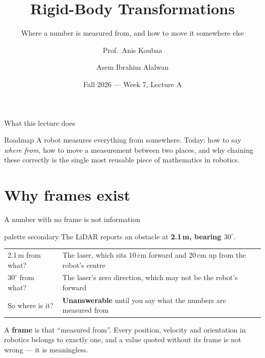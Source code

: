 \documentclass[aspectratio=169]{beamer}
\title[EE 414 --- Week 7A]{Rigid-Body Transformations}
\subtitle{Where a number is measured from, and how to move it somewhere else}
\author[Koubaa \and Alalwan]{Prof.\ Anis Koubaa \and Asem Ibrahim Alalwan}
\institute[Alfaisal University]{
    EE 414 --- Introduction to Robotics\\
    College of Engineering\\
    Alfaisal University
}
\date{Fall 2026 --- Week 7, Lecture A}
\begin{document}
\begin{frame}[plain]
  \titlepage
\end{frame}

\begin{frame}{What this lecture does}
  \begin{block}{Roadmap}
    \small A robot measures everything from somewhere. Today: how to say \emph{where from},
    how to move a measurement between two places, and why chaining these correctly is the
    single most reusable piece of mathematics in robotics.
  \end{block}
  \vspace{0.2em}
  {\scriptsize\tableofcontents[hideallsubsections]}
\end{frame}

\section{Why frames exist}

\begin{frame}{A number with no frame is not information}
  \begin{beamercolorbox}[sep=8pt,center,rounded=true]{palette secondary}
    \small The LiDAR reports an obstacle at \textbf{2.1\,m, bearing $30^\circ$}.
  \end{beamercolorbox}

  \vspace{0.9em}
  \small
  \begin{center}
  \begin{tabular}{@{}ll@{}}
    \toprule
    2.1\,m from what? & The laser, which sits 10\,cm forward and 20\,cm up from the robot's centre \\
    $30^\circ$ from what? & The laser's zero direction, which may not be the robot's forward \\
    So where is it? & \textbf{Unanswerable} until you say what the numbers are measured from \\
    \bottomrule
  \end{tabular}
  \end{center}

  \vspace{0.9em}
  A \textbf{frame} is that ``measured from''. Every position, velocity and orientation in
  robotics belongs to exactly one, and a value quoted without its frame is not wrong --- it is
  meaningless.
\end{frame}
\end{document}
